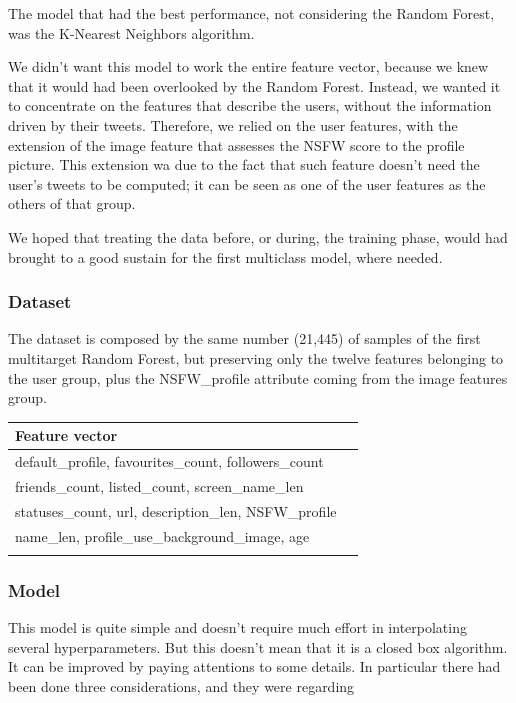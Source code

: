 The model that had the best performance, not considering the Random Forest, was the K-Nearest Neighbors algorithm.

We didn't want this model to work the entire feature vector, because we knew that it would had been overlooked by the Random Forest. Instead, we wanted it to concentrate on the features that describe the users, without the information driven by their tweets. Therefore, we relied on the user features, with the extension of the image feature that assesses the NSFW score to the profile picture. This extension wa due to the fact that such feature doesn't need the user's tweets to be computed; it can be seen as one of the user features as the others of that group.

We hoped that treating the data before, or during, the training phase, would had brought to a good sustain for the first multiclass model, where needed.

\subsubsection{Dataset}
The dataset is composed by the same number (21,445) of samples of the first multitarget Random Forest, but preserving only the twelve features belonging to the user group, plus the NSFW\_profile attribute coming from the image features group.

\small
\begin{center}
	\begin{tabular}{ll}
		\\Feature vector\\
		\hline\hline
		default\_profile, favourites\_count, followers\_count\\
		friends\_count, listed\_count, screen\_name\_len\\
		statuses\_count, url, description\_len, NSFW\_profile\\
		name\_len, profile\_use\_background\_image, age\\\hline\\
	\end{tabular}
\end{center}
\normalsize

\subsubsection{Model}

This model is quite simple and doesn't require much effort in interpolating several hyperparameters. But this doesn't mean that it is a closed box algorithm. It can be improved by paying attentions to some details. In particular there had been done three considerations, and they were regarding

